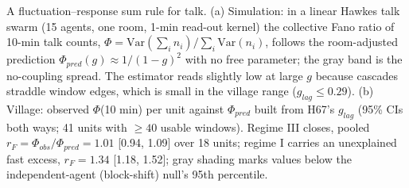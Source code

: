 \caption{A fluctuation--response sum rule for talk. (a) Simulation: in a linear Hawkes talk swarm (15 agents, one room, 1-min read-out kernel) the collective Fano ratio of 10-min talk counts, $\Phi=\mathrm{Var}(\sum_i n_i)/\sum_i\mathrm{Var}(n_i)$, follows the room-adjusted prediction $\Phi_{pred}(g)\approx1/(1-g)^2$ with no free parameter; the gray band is the no-coupling spread. The estimator reads slightly low at large $g$ because cascades straddle window edges, which is small in the village range ($g_{lag}\le0.29$). (b) Village: observed $\Phi$(10 min) per unit against $\Phi_{pred}$ built from H67's $g_{lag}$ (95\% CIs both ways; 41 units with $\ge40$ usable windows). Regime III closes, pooled $r_F=\Phi_{obs}/\Phi_{pred}=1.01$ [0.94, 1.09] over 18 units; regime I carries an unexplained fast excess, $r_F=1.34$ [1.18, 1.52]; gray shading marks values below the independent-agent (block-shift) null's 95th percentile.}
\label{fig:H111}
